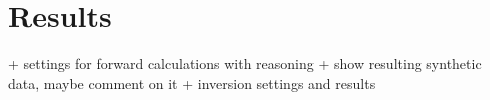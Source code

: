 \section{Results}\label{section:Results}
+ settings for forward calculations with reasoning
+ show resulting synthetic data, maybe comment on it
+ inversion settings and results
